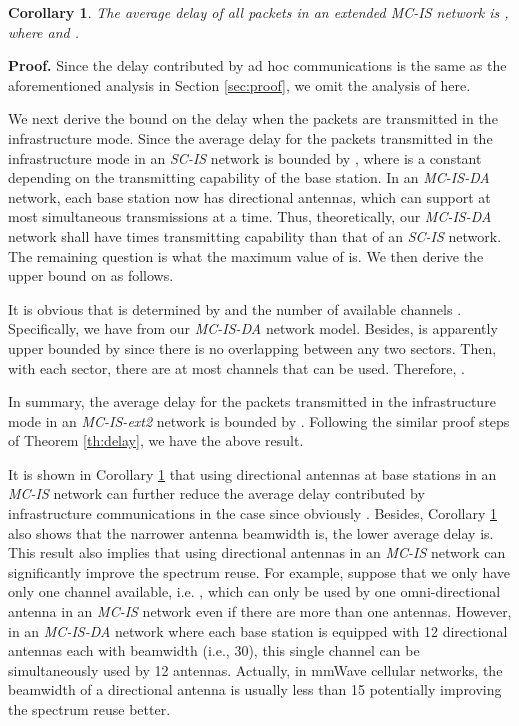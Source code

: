 \documentclass[10pt,journal]{IEEEtran}
\newtheorem{corollary}{Corollary}
\def\done{\hspace*{\fill} }
\begin{document}
\begin{corollary}
\label{cor:delay}
The average delay of all packets in an extended \textit{MC-IS} network is , where  and .
\end{corollary}
\textbf{Proof.} Since the delay contributed by ad hoc communications  is the same as the aforementioned analysis in Section \ref{sec:proof}, we omit the analysis of  here.

We next derive the bound on the delay when the packets are transmitted in the infrastructure mode. Since the average delay for the packets transmitted in the infrastructure mode in an \textit{SC-IS} network is bounded by  \cite{panli:jsac09}, where  is a constant depending on the transmitting capability of the base station. In an \emph{MC-IS-DA} network, each base station now has  directional antennas, which can support at most  simultaneous transmissions at a time. Thus, theoretically, our \emph{MC-IS-DA} network shall have  times transmitting capability than that of an \textit{SC-IS} network. The remaining question is what the maximum value of  is. We then derive the upper bound on  as follows. 

It is obvious that  is determined by  and the number of available channels . Specifically, we have  from our \emph{MC-IS-DA} network model. Besides,  is apparently upper bounded by  since there is no overlapping between any two sectors. Then, with each sector, there are at most  channels that can be used. Therefore, .

In summary, the average delay for the packets transmitted in the infrastructure mode in an \emph{MC-IS-ext2} network is bounded by . Following the similar proof steps of Theorem \ref{th:delay}, we have the above result.
\done

It is shown in Corollary \ref{cor:delay} that using directional antennas at base stations in an \emph{MC-IS} network can further reduce the average delay contributed by infrastructure communications  in the case  since obviously .  Besides, Corollary \ref{cor:delay} also shows that the narrower antenna beamwidth  is, the lower average delay  is. This result also implies that using directional antennas in an \emph{MC-IS} network can significantly improve the spectrum reuse. For example, suppose that we only have only one channel available, i.e. , which can only be used by one omni-directional antenna in an \emph{MC-IS} network even if there are more than one antennas. However, in an \emph{MC-IS-DA} network where each base station is equipped with 12 directional antennas each with beamwidth  (i.e., 30), this single channel can be simultaneously used by 12 antennas. Actually, in mmWave cellular networks, the beamwidth of a directional antenna is usually less than 15 \cite{Rappaport:Access2013} potentially improving the spectrum reuse better.
\end{document}
